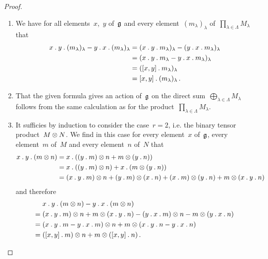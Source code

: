 \begin{proof}
	\leavevmode
	\begin{enumerate}
		\item
			We have for all elements~$x$,~$y$ of~$\mathfrak{g}$ and every element~$(m_\lambda)_\lambda$ of~$\prod_{\lambda \in \Lambda} M_\lambda$ that
			\begin{align*}
				x \mathbin{.} y \mathbin{.} (m_\lambda)_\lambda
				- y \mathbin{.} x \mathbin{.} (m_\lambda)_\lambda
				&=
				(x \mathbin{.} y \mathbin{.} m_\lambda)_\lambda
				- (y \mathbin{.} x \mathbin{.} m_\lambda)_\lambda
				\\
				&=
				(x \mathbin{.} y \mathbin{.} m_\lambda - y \mathbin{.} x \mathbin{.} m_\lambda)_\lambda
				\\
				&=
				([x,y] \mathbin{.} m_\lambda)_\lambda
				\\
				&=
				[x,y] \mathbin{.} (m_\lambda)_\lambda \,.
			\end{align*}
		\item
			That the given formula gives an action of~$\mathfrak{g}$ on the direct sum~$\bigoplus_{\lambda \in \Lambda} M_\lambda$ follows from the same calculation as for the product~$\prod_{\lambda \in \Lambda} M_\lambda$.
		\item
			It sufficies by induction to consider the case~$r = 2$, i.e. the binary tensor product~$M \otimes N$.
			We find in this case for every element~$x$ of~$\mathfrak{g}$, every element~$m$ of~$M$ and every element~$n$ of~$N$ that
			\begin{align*}
				x \mathbin{.} y \mathbin{.} (m \otimes n)
				&=
				x \mathbin{.} ( (y \mathbin{.} m) \otimes n
				+ m \otimes (y \mathbin{.} n) )
				\\
				&=
				x \mathbin{.} ( (y \mathbin{.} m) \otimes n)
				+ x \mathbin{.} (m \otimes (y \mathbin{.} n) )
				\\
				&=
				(x \mathbin{.} y \mathbin{.} m) \otimes n
				+ (y \mathbin{.} m) \otimes (x \mathbin{.} n)
				+ (x \mathbin{.} m) \otimes (y \mathbin{.} n)
				+ m \otimes (x \mathbin{.} y \mathbin{.} n)
			\end{align*}
			and therefore
			\begin{align*}
				{}&
				x \mathbin{.} y \mathbin{.} (m \otimes n)
				- y \mathbin{.} x \mathbin{.} (m \otimes n)
				\\
				={}&
				(x \mathbin{.} y \mathbin{.} m) \otimes n
				+ m \otimes (x \mathbin{.} y \mathbin{.} n)
				- (y \mathbin{.} x \mathbin{.} m) \otimes n
				- m \otimes (y \mathbin{.} x \mathbin{.} n)
				\\
				={}&
				(x \mathbin{.} y \mathbin{.} m - y \mathbin{.} x \mathbin{.} m) \otimes n
				+ m \otimes (x \mathbin{.} y \mathbin{.} n - y \mathbin{.} x \mathbin{.} n)
				\\
				={}&
				([x,y] \mathbin{.} m) \otimes n
				+ m \otimes ([x,y] \mathbin{.} n) \,.
			\end{align*}

\end{enumerate}
\end{proof}
